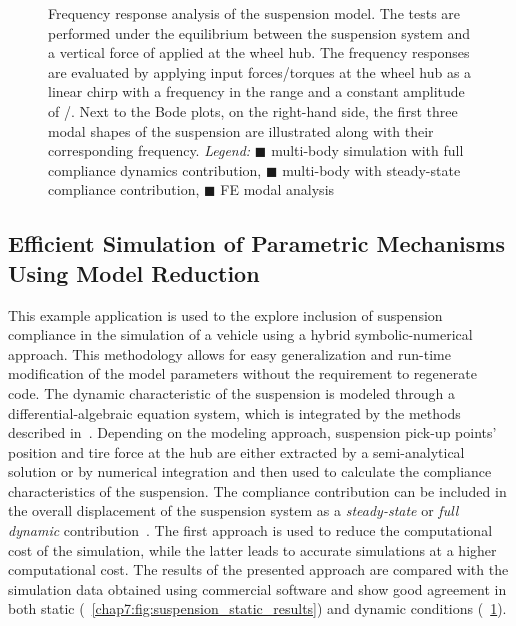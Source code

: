 \begin{figure}[!ht]
\begin{minipage}[c]{0.125\linewidth}
\begin{center}
    \end{center}
  \end{minipage}
  \caption{Frequency response analysis of the suspension model. The tests are performed under the equilibrium between the suspension system and a vertical force of  applied at the wheel hub. The frequency responses are evaluated by applying input forces/torques at the wheel hub as a linear chirp with a frequency in the range  and a constant amplitude of /. Next to the Bode plots, on the right-hand side, the first three modal shapes of the suspension are illustrated along with their corresponding frequency. \emph{Legend:} {\color{mycolor1}$\blacksquare$} \Simulink{} multi-body simulation with full compliance dynamics contribution, {\color{mycolor2}$\blacksquare$} \Simulink{} multi-body with steady-state compliance contribution, {\color{mycolor3}$\blacksquare$} \Ansys{} \ac{FE} modal analysis}
  \label{chap7:fig:suspension_dynamic_results}
\end{figure}

\subsection{Efficient Simulation of Parametric Mechanisms Using Model Reduction}

This example application is used to the explore inclusion of suspension compliance in the simulation of a vehicle using a hybrid symbolic-numerical approach. This methodology allows for easy generalization and run-time modification of the model parameters without the requirement to regenerate code. The dynamic characteristic of the suspension is modeled through a differential-algebraic equation system, which is integrated by the methods described in~\cite{larcher2024symbolic}. Depending on the modeling approach, suspension pick-up points' position and tire force at the hub are either extracted by a semi-analytical solution or by numerical integration and then used to calculate the compliance characteristics of the suspension. The compliance contribution can be included in the overall displacement of the suspension system as a \emph{steady-state} or \emph{full dynamic} contribution~\cite{larcher2024symbolic}. The first approach is used to reduce the computational cost of the simulation, while the latter leads to accurate simulations at a higher computational cost. The results of the presented approach are compared with the simulation data obtained using commercial software \Ansys{} and show good agreement in both static (\figurename{}~\ref{chap7:fig:suspension_static_results}) and dynamic conditions (\figurename{}~\ref{chap7:fig:suspension_dynamic_results}).

